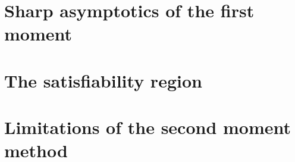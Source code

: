 \documentclass[letterpaper,11pt]{article}
\begin{document}
\section{Sharp asymptotics of the first moment}\label{sec:1st_moment}


\section{The satisfiability region}\label{sec:2nd_moment}


\section{Limitations of the second moment method}\label{sec:fail_2nd_moment}


\printbibliography
\end{document}

